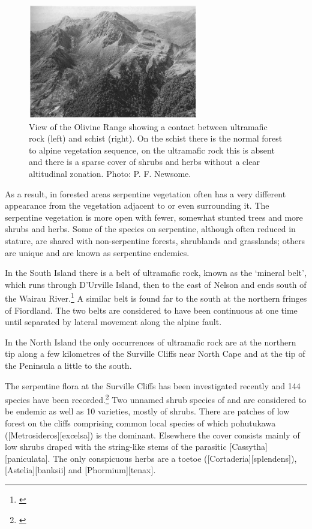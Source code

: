 \begin{figure}
	\includegraphics[width=0.66\textwidth]{graphics/figure89olivine-range.jpg}
	\centering
	\caption[View of the Olivine Range]{View of the Olivine Range showing a contact between ultramafic rock (left) and schist (right).
	On the schist there is the normal forest to alpine vegetation sequence, on the ultramafic rock this is absent and there is a sparse cover of shrubs and herbs without a clear altitudinal zonation.
	Photo: P. F. Newsome.}%
	\label{fig:89olivine-range}
\end{figure}

As a result, in forested areas serpentine vegetation often has a very different appearance from the vegetation adjacent to or even surrounding it.
The serpentine vegetation is more open with fewer, somewhat stunted trees and more shrubs and herbs.
Some of the species on serpentine, although often reduced in stature, are shared with non-serpentine forests, shrublands and grasslands; others are unique and are known as serpentine endemics.

In the South Island there is a belt of ultramafic rock, known as the `mineral belt', which runs through D'Urville Island, then to the east of Nelson and ends south of the Wairau River.\footnote{\cite{betts1918notes}}
A similar belt is found far to the south at the northern fringes of Fiordland.
The two belts are considered to have been continuous at one time until separated by lateral movement along the alpine fault.

In the North Island the only occurrences of ultramafic rock are at the northern tip along a few kilometres of the Surville Cliffs near North Cape and at the tip of the Peninsula a little to the south.

The serpentine flora at the Surville Cliffs has been investigated recently and 144 species have been recorded.\footnote{\cite{druce1979indigenous}}
Two unnamed shrub species of  and  are considered to be endemic as well as 10 varieties, mostly of shrubs.
There are patches of low forest on the cliffs comprising common local species of which pohutukawa ([Metrosideros][excelsa]) is the dominant.
Elsewhere the cover consists mainly of low shrubs draped with the string-like stems of the parasitic [Cassytha][paniculata].
The only conspicuous herbs are a toetoe ([Cortaderia][splendens]), [Astelia][banksii] and [Phormium][tenax].

